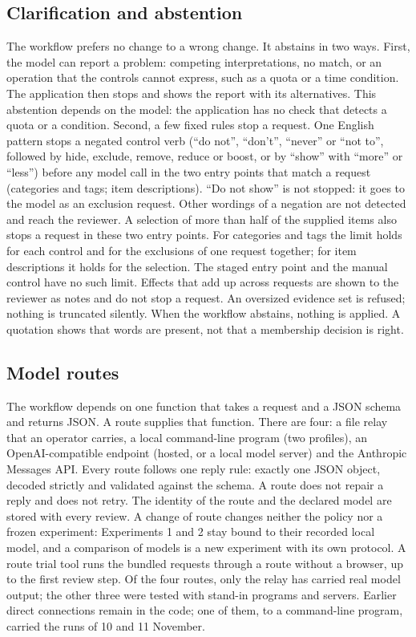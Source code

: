 \documentclass[conference]{IEEEtran}
\begin{document}
\subsection{Clarification and abstention}
The workflow prefers no change to a wrong change. It abstains in two ways. First, the model can report a problem: competing interpretations, no match, or an operation that the controls cannot express, such as a quota or a time condition. The application then stops and shows the report with its alternatives. This abstention depends on the model: the application has no check that detects a quota or a condition. Second, a few fixed rules stop a request. One English pattern stops a negated control verb (``do not'', ``don't'', ``never'' or ``not to'', followed by hide, exclude, remove, reduce or boost, or by ``show'' with ``more'' or ``less'') before any model call in the two entry points that match a request (categories and tags; item descriptions). ``Do not show'' is not stopped: it goes to the model as an exclusion request. Other wordings of a negation are not detected and reach the reviewer. A selection of more than half of the supplied items also stops a request in these two entry points. For categories and tags the limit holds for each control and for the exclusions of one request together; for item descriptions it holds for the selection. The staged entry point and the manual control have no such limit. Effects that add up across requests are shown to the reviewer as notes and do not stop a request. An oversized evidence set is refused; nothing is truncated silently. When the workflow abstains, nothing is applied. A quotation shows that words are present, not that a membership decision is right.

\subsection{Model routes}
The workflow depends on one function that takes a request and a JSON schema and returns JSON. A route supplies that function. There are four: a file relay that an operator carries, a local command-line program (two profiles), an OpenAI-compatible endpoint (hosted, or a local model server) and the Anthropic Messages API. Every route follows one reply rule: exactly one JSON object, decoded strictly and validated against the schema. A route does not repair a reply and does not retry. The identity of the route and the declared model are stored with every review. A change of route changes neither the policy nor a frozen experiment: Experiments 1 and 2 stay bound to their recorded local model, and a comparison of models is a new experiment with its own protocol. A route trial tool runs the bundled requests through a route without a browser, up to the first review step. Of the four routes, only the relay has carried real model output; the other three were tested with stand-in programs and servers. Earlier direct connections remain in the code; one of them, to a command-line program, carried the runs of 10 and 11 November.
\end{document}
